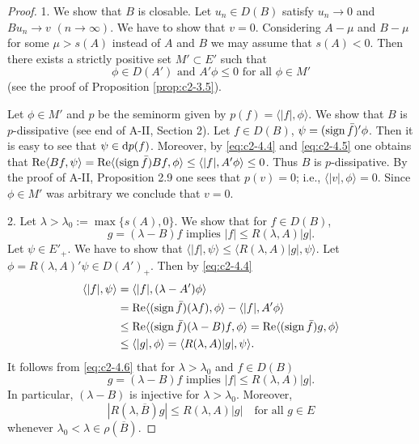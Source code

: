 \begin{proof}
1. We show that $B$ is closable.
Let $u_{n} \in D(B)$ satisfy $u_{n} \to 0$ and $Bu_{n} \to v$ $(n \to \infty)$.
We have to
show that $v = 0$. Considering $A - \mu$ and $B - \mu$ for some $\mu > s(A)$ instead of $A$ and $B$ we may assume that $s(A) < 0$. Then there
exists a strictly positive set $M' \subset E'$ such that
\begin{equation}\label{eq:c2-4.5}
\phi \in D(A') \text{ and } A'\phi \leq 0 \text{ for all } \phi \in M'
\end{equation}
(see the proof of Proposition \ref{prop:c2-3.5}).

Let $\phi \in M'$ and $p$ be the seminorm given by $p(f) = \langle|f|,\phi\rangle$. 
We show that $B$ is $p$-dissipative (see end of A-II, Section 2).
Let $f \in D(B)$, $\psi = (\operatorname{sign}  \bar{f})'\phi$. 
Then it is easy to see that $\psi \in \mathop{}\!\mathrm{d}{p}(f)$. 
Moreover, by \eqref{eq:c2-4.4} and \eqref{eq:c2-4.5} one obtains that 
$\mathop{}\!\mathrm{Re}\langle Bf,\psi\rangle = \mathop{}\!\mathrm{Re}\langle(\operatorname{sign}  \bar{f})Bf,\phi\rangle \leq \langle|f|,A'\phi\rangle \leq 0$. 
Thus $B$ is $p$-dissipative. 
By the proof of A-II, Proposition 2.9 
one sees that $p(v) = 0$; i.e., $\langle|v|,\phi\rangle = 0$.
Since $\phi \in M'$ was arbitrary we conclude that $v = 0$.

2. Let $\lambda > \lambda_{0} := \max\{s(A),0\}$. 
We show that for $f \in D(B)$,
\begin{equation}\label{eq:c2-4.6}
g = (\lambda - B)f \text{ implies } |f| \leq R(\lambda,A)|g|.
\end{equation}
Let $\psi \in E'_{+}$. 
We have to show that 
$\langle|f|,\psi\rangle \leq \langle R(\lambda,A)|g|,\psi\rangle$.
Let $\phi = R(\lambda,A)'\psi \in D(A')_{+}$. 
Then by \eqref{eq:c2-4.4}
\begin{align*}
\langle|f|,\psi\rangle &= \langle|f|, (\lambda - A')\phi\rangle \\
&= \mathop{}\!\mathrm{Re}\langle(\operatorname{sign}  \bar{f})(\lambda f),\phi\rangle - \langle|f|,A'\phi\rangle\\
&\leq \mathop{}\!\mathrm{Re}\langle(\operatorname{sign}  \bar{f})(\lambda - B)f,\phi\rangle = \mathop{}\!\mathrm{Re}\langle(\operatorname{sign}  \bar{f})g,\phi\rangle\\
&\leq \langle|g|,\phi\rangle = \langle R(\lambda,A)|g|,\psi\rangle .
\end{align*}
It follows from \eqref{eq:c2-4.6} that for $\lambda > \lambda_{0}$ and $f \in D(B)$
\begin{equation}\label{eq:c2-4.7}
g = (\lambda - B)f \text{ implies } |f| \leq R(\lambda,A)|g|.
\end{equation}
In particular, $(\lambda - B)$ is injective for $\lambda > \lambda_{0}$. 
Moreover,
\begin{equation}\label{eq:c2-4.8}
|R(\lambda,\overline{B})g| \leq R(\lambda,A)|g| \quad \text{for all } g \in E
\end{equation}
whenever $\lambda_{0} < \lambda \in \rho(\overline{B})$.


\end{proof}
